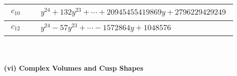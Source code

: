 \documentclass[1p]{elsarticle_modified}
\theoremstyle{definition}
\begin{document}
\begin{tabular}{m{50pt}|m{274pt}}
\hline $$\begin{aligned}c_{10}\end{aligned}$$&$\begin{aligned}
&y^{24}+132 y^{23}+\cdots+20945455419869 y+2796229429249
\end{aligned}$\\
\hline $$\begin{aligned}c_{12}\end{aligned}$$&$\begin{aligned}
&y^{24}-57 y^{23}+\cdots-1572864 y+1048576
\end{aligned}$\\
\hline
\end{tabular}\\~\\
\newpage\flushleft \textbf{(vi) Complex Volumes and Cusp Shapes}
\end{document}
